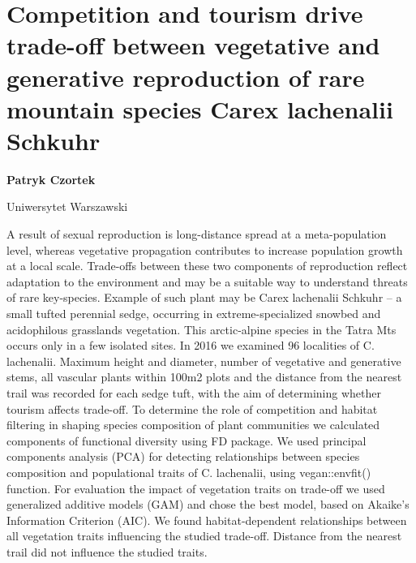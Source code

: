 \documentclass[\main/boa.tex]{subfiles}
\begin{document}
\section{Competition and tourism drive trade-off between vegetative and generative reproduction of rare mountain species Carex lachenalii Schkuhr}

\begin{minipage}{0.915\textwidth}
	\centering
  {\bf {} Patryk Czortek}
\end{minipage}

\vskip 0.3cm

\begin{affiliations}
\begin{minipage}{0.915\textwidth}
\centering
Uniwersytet Warszawski  \\[-2pt]
\end{minipage}
\end{affiliations}

\vskip 0.8cm

 A result of sexual reproduction is long-distance spread at a meta-population level, whereas vegetative propagation contributes to increase population growth at a local scale. Trade-offs between these two components of reproduction reflect adaptation to the environment and may be a suitable way to understand threats of rare key-species. Example of such plant may be Carex lachenalii Schkuhr – a small tufted perennial sedge, occurring in extreme-specialized snowbed and acidophilous grasslands vegetation. This arctic-alpine species in the Tatra Mts occurs only in a few isolated sites. In 2016 we examined 96 localities of C. lachenalii. Maximum height and diameter, number of vegetative and generative stems, all vascular plants within 100m2 plots and the distance from the nearest trail was recorded for each sedge tuft, with the aim of determining whether tourism affects trade-off. To determine the role of competition and habitat filtering in shaping species composition of plant communities we calculated components of functional diversity using FD package. We used principal components analysis (PCA) for detecting relationships between species composition and populational traits of C. lachenalii, using vegan::envfit() function. For evaluation the impact of vegetation traits on trade-off we used generalized additive models (GAM) and chose the best model, based on Akaike’s Information Criterion (AIC). We found habitat-dependent relationships between all vegetation traits influencing the studied trade-off. Distance from the nearest trail did not influence the studied traits. 
\end{document}
